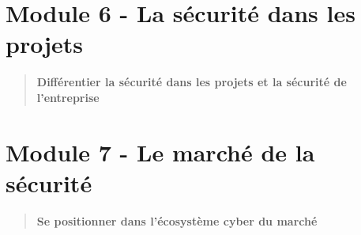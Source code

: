 \section{Module 6 - La sécurité dans les
projets}\label{module-6---la-suxe9curituxe9-dans-les-projets}

\begin{quote}
\textbf{Différentier la sécurité dans les projets et la sécurité de
l'entreprise}
\end{quote}

\section{Module 7 - Le marché de la
sécurité}\label{module-7---le-marchuxe9-de-la-suxe9curituxe9}

\begin{quote}
\textbf{Se positionner dans l'écosystème cyber du marché}
\end{quote}
